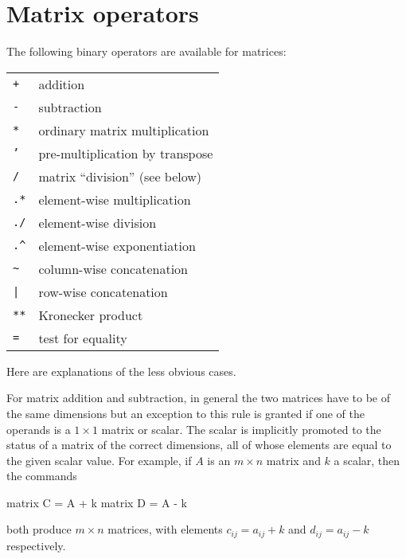 
\section{Matrix operators}
\label{matrix-op}

The following binary operators are available for matrices:

\begin{center}
\begin{tabular}{ll}
\texttt{+}  & addition \\
\texttt{-}  & subtraction \\
\texttt{*}  & ordinary matrix multiplication \\
\texttt{'}  & pre-multiplication by transpose \\
\texttt{/}  & matrix ``division'' (see below) \\
\texttt{.*} & element-wise multiplication \\
\texttt{./} & element-wise division \\
\verb+.^+   & element-wise exponentiation \\
\verb+~+    & column-wise concatenation \\
\verb+|+    & row-wise concatenation \\
\texttt{**} & Kronecker product \\
\texttt{=}  & test for equality 
\end{tabular}
\end{center}

Here are explanations of the less obvious cases. 

For matrix addition and subtraction, in general the two matrices have
to be of the same dimensions but an exception to this rule is granted
if one of the operands is a $1\times 1$ matrix or scalar.  The scalar
is implicitly promoted to the status of a matrix of the correct
dimensions, all of whose elements are equal to the given scalar value.
For example, if $A$ is an $m \times n$ matrix and $k$ a scalar, then
the commands
%
\begin{code}
matrix C = A + k
matrix D = A - k
\end{code}
%
both produce $m \times n$ matrices, with elements $c_{ij} = 
a_{ij} + k$ and $d_{ij} = a_{ij} - k$ respectively.

